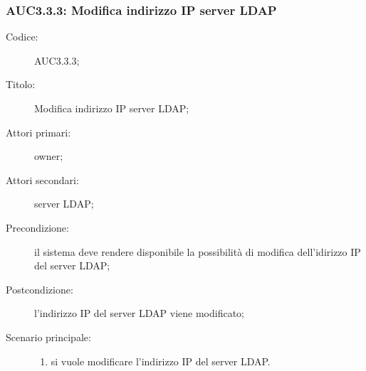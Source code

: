 \documentclass[../../../analisi-dei-requisiti.tex]{subfiles}
\begin{document}
\subsubsection{AUC3.3.3: Modifica indirizzo IP server LDAP}%
\label{subs:AUC3.3.3}
\begin{description}
  \item[Codice:] AUC3.3.3;
  \item[Titolo:] Modifica indirizzo IP server LDAP\@;
  \item[Attori primari:] owner;
  \item[Attori secondari:] server LDAP\@;
  \item[Precondizione:] il sistema deve rendere disponibile la possibilità di modifica dell'idirizzo IP del server LDAP\@;
  \item[Postcondizione:] l'indirizzo IP del server LDAP viene modificato;
  \item[Scenario principale:]
        \begin{enumerate}
          \item si vuole modificare l'indirizzo IP del server LDAP\@.
        \end{enumerate}
\end{description}
\end{document}
